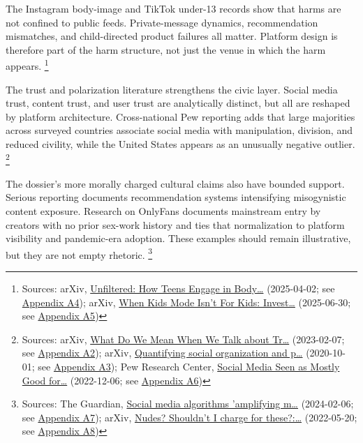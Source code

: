 \documentclass[
  american,
  11pt,
  letterpaper,
]{article}
\begin{document}
The Instagram body-image and TikTok under-13 records show that harms are
not confined to public feeds. Private-message dynamics, recommendation
mismatches, and child-directed product failures all matter. Platform
design is therefore part of the harm structure, not just the venue in
which the harm appears. \footnote{Sources: arXiv,
  \href{https://arxiv.org/abs/2504.02176}{Unfiltered: How Teens Engage
  in Body\ldots{}} (2025-04-02; see
  \hyperref[appendix-a4-unfiltered-how-teens-engage-in-body-image-and-shaming-discussions-via-instagram-direct-messages-dms]{Appendix
  A4}); arXiv, \href{https://arxiv.org/abs/2507.00299}{When Kids Mode
  Isn't For Kids: Invest\ldots{}} (2025-06-30; see
  \hyperref[appendix-a5-when-kids-mode-isn-t-for-kids-investigating-tiktok-s-under-13-experience]{Appendix
  A5})}

The trust and polarization literature strengthens the civic layer.
Social media trust, content trust, and user trust are analytically
distinct, but all are reshaped by platform architecture. Cross-national
Pew reporting adds that large majorities across surveyed countries
associate social media with manipulation, division, and reduced
civility, while the United States appears as an unusually negative
outlier. \footnote{Sources: arXiv,
  \href{https://arxiv.org/abs/2302.03671}{What Do We Mean When We Talk
  about Tr\ldots{}} (2023-02-07; see
  \hyperref[appendix-a2-what-do-we-mean-when-we-talk-about-trust-in-social-media-a-systematic-review]{Appendix
  A2}); arXiv, \href{https://arxiv.org/abs/2010.00590}{Quantifying
  social organization and p\ldots{}} (2020-10-01; see
  \hyperref[appendix-a3-quantifying-social-organization-and-political-polarization-in-online-platforms]{Appendix
  A3}); Pew Research Center,
  \href{https://www.pewresearch.org/global/2022/12/06/social-media-seen-as-mostly-good-for-democracy-across-many-nations-but-u-s-is-a-major-outlier/}{Social
  Media Seen as Mostly Good for\ldots{}} (2022-12-06; see
  \hyperref[appendix-a6-social-media-seen-as-mostly-good-for-democracy-across-many-nations-but-u-s-is-a-major-outlier]{Appendix
  A6})}

The dossier's more morally charged cultural claims also have bounded
support. Serious reporting documents recommendation systems intensifying
misogynistic content exposure. Research on OnlyFans documents mainstream
entry by creators with no prior sex-work history and ties that
normalization to platform visibility and pandemic-era adoption. These
examples should remain illustrative, but they are not empty rhetoric.
\footnote{Sources: The Guardian,
  \href{https://www.theguardian.com/media/2024/feb/06/social-media-algorithms-amplifying-misogynistic-content}{Social
  media algorithms 'amplifying m\ldots{}} (2024-02-06; see
  \hyperref[appendix-a7-social-media-algorithms-amplifying-misogynistic-content]{Appendix
  A7}); arXiv, \href{https://arxiv.org/abs/2205.10425}{Nudes? Shouldn't
  I charge for these?:\ldots{}} (2022-05-20; see
  \hyperref[appendix-a8-nudes-shouldn-t-i-charge-for-these-motivations-of-new-sexual-content-creators-on-onlyfans]{Appendix
  A8})}
\end{document}
